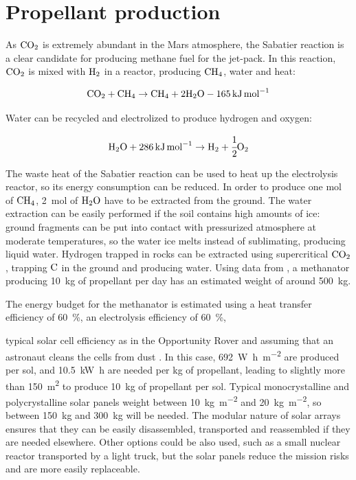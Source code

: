 \documentclass[twocolumn]{article}
\newcommand{\COtwo}{\textnormal{CO}_2}
\newcommand{\Otwo}{\textnormal{O}_2}
\newcommand{\CHfour}{\textnormal{CH}_4}
\newcommand{\Htwo}{\textnormal{H}_2}
\newcommand{\HtwoO}{\textnormal{H}_2\textnormal{O}}
\begin{document}
\section{Propellant production}

As $\COtwo$ is extremely abundant in the Mars atmosphere, the 
Sabatier reaction is a clear candidate for producing methane fuel for the 
jet-pack. In this reaction, $\COtwo$ is mixed with 
$\Htwo$ in a reactor, producing $\CHfour$, water and heat:

\begin{equation}
  \COtwo + \CHfour \rightarrow \CHfour + 2 \HtwoO
  - \SI{165}{\kilo\joule\per\mol}
\end{equation}

Water can be recycled and electrolized to produce hydrogen and oxygen:

\begin{equation}
  \HtwoO + \SI{286}{\kilo\joule\per\mol} \rightarrow
  \Htwo + \cfrac{1}{2} \Otwo
\end{equation}

The waste heat of the Sabatier reaction can be used to heat up the electrolysis 
reactor, so its energy consumption can be reduced. In order to produce one mol 
of $\CHfour$, \SI{2}{\mol} of $\HtwoO$ have to be extracted from the ground. 
The water extraction can be easily performed if the soil contains high amounts 
of ice: ground fragments can be put into contact with pressurized atmosphere at 
moderate temperatures, so the water ice melts instead of sublimating, producing 
liquid water. Hydrogen trapped in rocks can be extracted using supercritical
$\COtwo$, trapping $\textnormal{C}$ in the ground and producing water. Using 
data from \cite{methanator}, a methanator producing \SI{10}{\kilogram} of 
propellant per day has an estimated weight of around \SI{500}{\kilogram}.

The energy budget for the methanator is estimated using a heat transfer 
efficiency of \SI{60}{\percent}, an electrolysis efficiency of 
\SI{60}{\percent},

typical solar cell efficiency as in the Opportunity Rover 
and 
assuming that an astronaut cleans the cells from dust 
\cite{opportunity_power,merlaunch}. In this case, 
\SI{692}{\watt\hour\per\square\metre} are produced per sol, and 
\SI{10.5}{\kilo\watt\hour} are needed per \si{\kilogram} of propellant, leading 
to slightly more than \SI{150}{\square\metre} to produce \SI{10}{\kilogram} of 
propellant per sol. Typical monocrystalline and polycrystalline solar panels 
weight between \SI{10}{\kilogram\per\square\metre} and 
\SI{20}{\kilogram\per\square\metre}, so between \SI{150}{\kilogram} and 
\SI{300}{\kilogram} will be needed. The modular nature of solar arrays ensures 
that they can be easily disassembled, transported and reassembled if they are 
needed elsewhere. Other options could be also used, such as a small nuclear 
reactor transported by a light truck, but the solar panels reduce the mission 
risks and are more easily replaceable.
\end{document}
